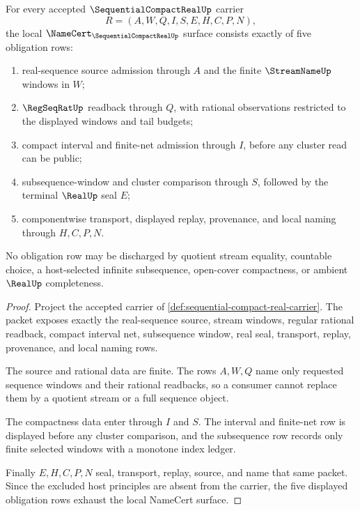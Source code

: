 \begin{theorem}
\label{thm:sequential-compact-real-namecert-obligations}
For every accepted $\SequentialCompactRealUp$ carrier
$$
R=(A,W,Q,I,S,E,H,C,P,N),
$$
the local $\NameCert_{\SequentialCompactRealUp}$ surface consists exactly of five obligation rows:
\begin{enumerate}
\item real-sequence source admission through $A$ and the finite $\StreamNameUp$ windows in $W$;
\item $\RegSeqRatUp$ readback through $Q$, with rational observations restricted to the displayed windows and tail budgets;
\item compact interval and finite-net admission through $I$, before any cluster read can be public;
\item subsequence-window and cluster comparison through $S$, followed by the terminal $\RealUp$ seal $E$;
\item componentwise transport, displayed replay, provenance, and local naming through $H,C,P,N$.
\end{enumerate}
No obligation row may be discharged by quotient stream equality, countable choice, a host-selected infinite subsequence, open-cover compactness, or ambient $\RealUp$ completeness.
\end{theorem}
\begin{proof}
Project the accepted carrier of \autoref{def:sequential-compact-real-carrier}. The packet exposes exactly the real-sequence source, stream windows, regular rational readback, compact interval net, subsequence window, real seal, transport, replay, provenance, and local naming rows.

The source and rational data are finite. The rows $A,W,Q$ name only requested sequence windows and their rational readbacks, so a consumer cannot replace them by a quotient stream or a full sequence object.

The compactness data enter through $I$ and $S$. The interval and finite-net row is displayed before any cluster comparison, and the subsequence row records only finite selected windows with a monotone index ledger.

Finally $E,H,C,P,N$ seal, transport, replay, source, and name that same packet. Since the excluded host principles are absent from the carrier, the five displayed obligation rows exhaust the local NameCert surface.
\end{proof}

